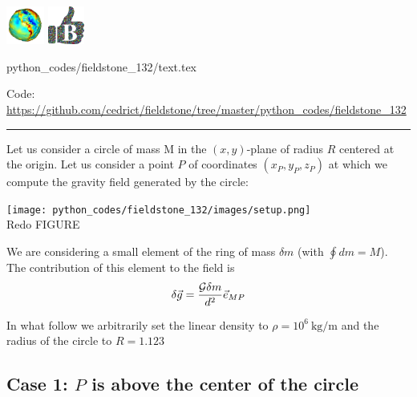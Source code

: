 \includegraphics[height=1.25cm]{images/pictograms/gravity}
\includegraphics[height=1.25cm]{images/pictograms/benchmark}


\begin{flushright} {\tiny {\color{gray} python\_codes/fieldstone\_132/text.tex}} \end{flushright}



\begin{center}
\inpython
Code: \url{https://github.com/cedrict/fieldstone/tree/master/python_codes/fieldstone_132}
\end{center}

\par\noindent\rule{\textwidth}{0.4pt}

Let us consider a circle of mass M in the $(x,y)$-plane of radius $R$ centered at the origin.
Let us consider a point $P$ of coordinates $(x_P,y_P,z_P)$ at which we compute the 
gravity field generated by the circle:

\begin{center}
\texttt{[image: python\_codes/fieldstone\_132/images/setup.png]}\\
{\captionfont Redo FIGURE}
\end{center}

We are considering a small element of the ring of mass $\delta m$ (with $\oint dm = M$). 
The contribution of this element to the field is
\[
\delta \vec{g} = \frac{{\cal G} \delta m}{d^2} \vec{e}_{MP}
\]

In what follow we arbitrarily set the linear density to $\rho=10^6~\si{\kg\per\meter}$ and 
the radius of the circle to $R=1.123$

\subsection*{Case 1: $P$ is above the center of the circle}

